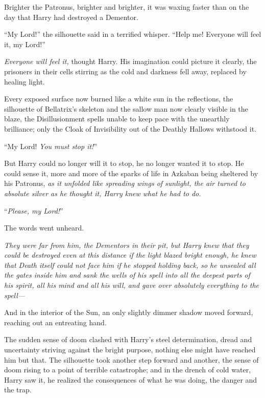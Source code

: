 Brighter the Patronus, brighter and brighter, it was waxing faster than on the day that Harry had destroyed a Dementor.

“My Lord!” the silhouette said in a terrified whisper. “Help me! Everyone will feel it, my Lord!”

\emph{Everyone will feel it,} thought Harry. His imagination could picture it clearly, the prisoners in their cells stirring as the cold and darkness fell away, replaced by healing light.

Every exposed surface now burned like a white sun in the reflections, the silhouette of Bellatrix’s skeleton and the sallow man now clearly visible in the blaze, the Disillusionment spells unable to keep pace with the unearthly brilliance; only the Cloak of Invisibility out of the Deathly Hallows withstood it.

“My Lord! \emph{You must stop it!}”

But Harry could no longer will it to stop, he no longer wanted it to stop. He could sense it, more and more of the sparks of life in Azkaban being sheltered by his Patronus, \emph{as it unfolded like spreading wings of sunlight, the air turned to absolute silver as he thought it, Harry knew what he had to do.}

“\emph{Please, my Lord!}”

The words went unheard.

\emph{They were far from him, the Dementors in their pit, but Harry knew that they could be destroyed even at this distance if the light blazed bright enough, he knew that Death itself could not face him if he stopped holding back, so he unsealed all the gates inside him and sank the wells of his spell into all the deepest parts of his spirit, all his mind and all his will, and gave over absolutely everything to the spell—}

And in the interior of the Sun, an only slightly dimmer shadow moved forward, reaching out an entreating hand.


The sudden sense of doom clashed with Harry’s steel determination, dread and uncertainty striving against the bright purpose, nothing else might have reached him but that. The silhouette took another step forward and another, the sense of doom rising to a point of terrible catastrophe; and in the drench of cold water, Harry saw it, he realized the consequences of what he was doing, the danger and the trap.

